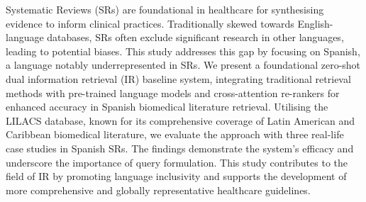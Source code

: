 Systematic Reviews (SRs) are foundational in healthcare for synthesising evidence to inform clinical practices. Traditionally skewed towards English-language databases, SRs often exclude significant research in other languages, leading to potential biases. This study addresses this gap by focusing on Spanish, a language notably underrepresented in SRs. We present a foundational zero-shot dual information retrieval (IR) baseline system, integrating traditional retrieval methods with pre-trained language models and cross-attention re-rankers for enhanced accuracy in Spanish biomedical literature retrieval. Utilising the LILACS database, known for its comprehensive coverage of Latin American and Caribbean biomedical literature, we evaluate the approach with three real-life case studies in Spanish SRs. The findings demonstrate the system's efficacy and underscore the importance of query formulation. This study contributes to the field of IR by promoting language inclusivity and supports the development of more comprehensive and globally representative healthcare guidelines.